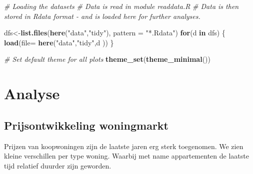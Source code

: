 \documentclass[
]{article}
\newenvironment{Shaded}{\begin{snugshade}}{\end{snugshade}}
\newcommand{\CommentTok}[1]{\textcolor[rgb]{0.56,0.35,0.01}{\textit{#1}}}
\newcommand{\ControlFlowTok}[1]{\textcolor[rgb]{0.13,0.29,0.53}{\textbf{#1}}}
\newcommand{\DataTypeTok}[1]{\textcolor[rgb]{0.13,0.29,0.53}{#1}}
\newcommand{\KeywordTok}[1]{\textcolor[rgb]{0.13,0.29,0.53}{\textbf{#1}}}
\newcommand{\NormalTok}[1]{#1}
\newcommand{\OperatorTok}[1]{\textcolor[rgb]{0.81,0.36,0.00}{\textbf{#1}}}
\newcommand{\StringTok}[1]{\textcolor[rgb]{0.31,0.60,0.02}{#1}}
\begin{document}
\begin{Shaded}
\begin{Highlighting}[]
\CommentTok{# Loading the datasets}
\CommentTok{# Data is read in module readdata.R}
\CommentTok{# Data is then stored in Rdata format - and is loaded here for further analyses.}

\NormalTok{dfs<-}\KeywordTok{list.files}\NormalTok{(}\KeywordTok{here}\NormalTok{(}\StringTok{"data"}\NormalTok{,}\StringTok{"tidy"}\NormalTok{), }\DataTypeTok{pattern =} \StringTok{"*.Rdata"}\NormalTok{)}
\ControlFlowTok{for}\NormalTok{(d }\ControlFlowTok{in}\NormalTok{ dfs) \{}
  \KeywordTok{load}\NormalTok{(}\DataTypeTok{file=} \KeywordTok{here}\NormalTok{(}\StringTok{"data"}\NormalTok{,}\StringTok{"tidy"}\NormalTok{,d ))}
\NormalTok{\}}

\CommentTok{# Set default theme for all plots}
\KeywordTok{theme_set}\NormalTok{(}\KeywordTok{theme_minimal}\NormalTok{())}
\end{Highlighting}
\end{Shaded}

\hypertarget{analyse}{%
\section{Analyse}\label{analyse}}

\hypertarget{prijsontwikkeling-woningmarkt}{%
\subsection{Prijsontwikkeling
woningmarkt}\label{prijsontwikkeling-woningmarkt}}

Prijzen van koopwoningen zijn de laatste jaren erg sterk toegenomen. We
zien kleine verschillen per type woning. Waarbij met name appartementen
de laatste tijd relatief duurder zijn geworden.

\begin{Shaded}
\end{Shaded}
\end{document}
